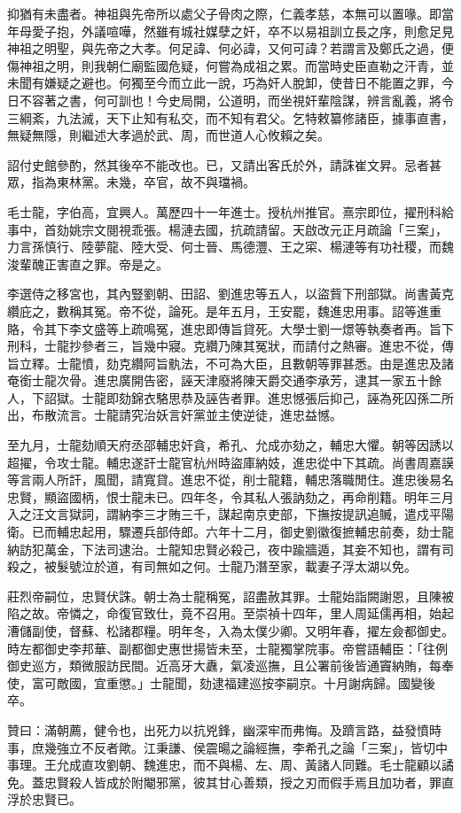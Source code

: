 \begin{pinyinscope}
抑猶有未盡者。神祖與先帝所以處父子骨肉之際，仁義孝慈，本無可以置喙。即當年母愛子抱，外議喧嘩，然雖有城社媒孽之奸，卒不以易祖訓立長之序，則愈足見神祖之明聖，與先帝之大孝。何足諱、何必諱，又何可諱？若謂言及鄭氏之過，便傷神祖之明，則我朝仁廟監國危疑，何嘗為成祖之累。而當時史臣直勒之汗青，並未聞有嫌疑之避也。何獨至今而立此一說，巧為奸人脫卸，使昔日不能置之罪，今日不容著之書，何可訓也！今史局開，公道明，而坐視奸輩陰謀，辨言亂義，將令三綱紊，九法滅，天下止知有私交，而不知有君父。乞特敕纂修諸臣，據事直書，無疑無隱，則繼述大孝過於武、周，而世道人心攸賴之矣。

詔付史館參酌，然其後卒不能改也。已，又請出客氏於外，請誅崔文昇。忌者甚眾，指為東林黨。未幾，卒官，故不與璫禍。

毛士龍，字伯高，宜興人。萬歷四十一年進士。授杭州推官。熹宗即位，擢刑科給事中，首劾姚宗文閱視乖張。楊漣去國，抗疏請留。天啟改元正月疏論「三案」，力言孫慎行、陸夢龍、陸大受、何士晉、馬德灃、王之寀、楊漣等有功社稷，而魏浚輩醜正害直之罪。帝是之。

李選侍之移宮也，其內豎劉朝、田詔、劉進忠等五人，以盜貲下刑部獄。尚書黃克纘庇之，數稱其冤。帝不從，論死。是年五月，王安罷，魏進忠用事。詔等進重賂，令其下李文盛等上疏鳴冤，進忠即傳旨貸死。大學士劉一燝等執奏者再。旨下刑科，士龍抄參者三，旨幾中寢。克纘乃陳其冤狀，而請付之熱審。進忠不從，傳旨立釋。士龍憤，劾克纘阿旨骫法，不可為大臣，且數朝等罪甚悉。由是進忠及諸奄銜士龍次骨。進忠廣開告密，誣天津廢將陳天爵交通李承芳，逮其一家五十餘人，下詔獄。士龍即劾錦衣駱思恭及誣告者罪。進忠憾張后抑己，誣為死囚孫二所出，布散流言。士龍請究治妖言奸黨並主使逆徒，進忠益憾。

至九月，士龍劾順天府丞邵輔忠奸貪，希孔、允成亦劾之，輔忠大懼。朝等因誘以超擢，令攻士龍。輔忠遂訐士龍官杭州時盜庫納妓，進忠從中下其疏。尚書周嘉謨等言兩人所訐，風聞，請寬貸。進忠不從，削士龍籍，輔忠落職閒住。進忠後易名忠賢，顯盜國柄，恨士龍未已。四年冬，令其私人張訥劾之，再命削籍。明年三月入之汪文言獄詞，謂納李三才賄三千，謀起南京吏部，下撫按提訊追贓，遣戍平陽衛。已而輔忠起用，驟遷兵部侍郎。六年十二月，御史劉徽復摭輔忠前奏，劾士龍納訪犯萬金，下法司逮治。士龍知忠賢必殺己，夜中踰牆遁，其妾不知也，謂有司殺之，被髮號泣於道，有司無如之何。士龍乃潛至家，載妻子浮太湖以免。

莊烈帝嗣位，忠賢伏誅。朝士為士龍稱冤，詔盡赦其罪。士龍始詣闕謝恩，且陳被陷之故。帝憐之，命復官致仕，竟不召用。至崇禎十四年，里人周延儒再相，始起漕儲副使，督蘇、松諸郡糧。明年冬，入為太僕少卿。又明年春，擢左僉都御史。時左都御史李邦華、副都御史惠世揚皆未至，士龍獨掌院事。帝嘗語輔臣：「往例御史巡方，類微服訪民間。近高牙大纛，氣凌巡撫，且公署前後皆通竇納賄，每奉使，富可敵國，宜重懲。」士龍聞，劾逮福建巡按李嗣京。十月謝病歸。國變後卒。

贊曰：滿朝薦，健令也，出死力以抗兇鋒，幽深牢而弗悔。及躋言路，益發憤時事，庶幾強立不反者歟。江秉謙、侯震暘之論經撫，李希孔之論「三案」，皆切中事理。王允成直攻劉朝、魏進忠，而不與楊、左、周、黃諸人同難。毛士龍顧以譎免。蓋忠賢殺人皆成於附閹邪黨，彼其甘心善類，授之刃而假手焉且加功者，罪直浮於忠賢已。


\end{pinyinscope}